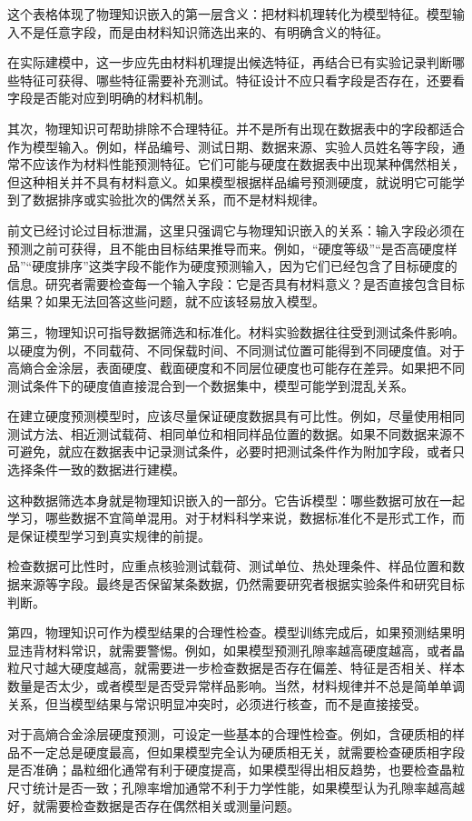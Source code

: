 这个表格体现了物理知识嵌入的第一层含义：把材料机理转化为模型特征。模型输入不是任意字段，而是由材料知识筛选出来的、有明确含义的特征。


在实际建模中，这一步应先由材料机理提出候选特征，再结合已有实验记录判断哪些特征可获得、哪些特征需要补充测试。特征设计不应只看字段是否存在，还要看字段是否能对应到明确的材料机制。


其次，物理知识可帮助排除不合理特征。并不是所有出现在数据表中的字段都适合作为模型输入。例如，样品编号、测试日期、数据来源、实验人员姓名等字段，通常不应该作为材料性能预测特征。它们可能与硬度在数据表中出现某种偶然相关，但这种相关并不具有材料意义。如果模型根据样品编号预测硬度，就说明它可能学到了数据排序或实验批次的偶然关系，而不是材料规律。


前文已经讨论过目标泄漏，这里只强调它与物理知识嵌入的关系：输入字段必须在预测之前可获得，且不能由目标结果推导而来。例如，“硬度等级”“是否高硬度样品”“硬度排序”这类字段不能作为硬度预测输入，因为它们已经包含了目标硬度的信息。研究者需要检查每一个输入字段：它是否具有材料意义？是否直接包含目标结果？如果无法回答这些问题，就不应该轻易放入模型。


第三，物理知识可指导数据筛选和标准化。材料实验数据往往受到测试条件影响。以硬度为例，不同载荷、不同保载时间、不同测试位置可能得到不同硬度值。对于高熵合金涂层，表面硬度、截面硬度和不同层位硬度也可能存在差异。如果把不同测试条件下的硬度值直接混合到一个数据集中，模型可能学到混乱关系。


在建立硬度预测模型时，应该尽量保证硬度数据具有可比性。例如，尽量使用相同测试方法、相近测试载荷、相同单位和相同样品位置的数据。如果不同数据来源不可避免，就应在数据表中记录测试条件，必要时把测试条件作为附加字段，或者只选择条件一致的数据进行建模。


这种数据筛选本身就是物理知识嵌入的一部分。它告诉模型：哪些数据可放在一起学习，哪些数据不宜简单混用。对于材料科学来说，数据标准化不是形式工作，而是保证模型学习到真实规律的前提。


检查数据可比性时，应重点核验测试载荷、测试单位、热处理条件、样品位置和数据来源等字段。最终是否保留某条数据，仍然需要研究者根据实验条件和研究目标判断。


第四，物理知识可作为模型结果的合理性检查。模型训练完成后，如果预测结果明显违背材料常识，就需要警惕。例如，如果模型预测孔隙率越高硬度越高，或者晶粒尺寸越大硬度越高，就需要进一步检查数据是否存在偏差、特征是否相关、样本数量是否太少，或者模型是否受异常样品影响。当然，材料规律并不总是简单单调关系，但当模型结果与常识明显冲突时，必须进行核查，而不是直接接受。


对于高熵合金涂层硬度预测，可设定一些基本的合理性检查。例如，含硬质相的样品不一定总是硬度最高，但如果模型完全认为硬质相无关，就需要检查硬质相字段是否准确；晶粒细化通常有利于硬度提高，如果模型得出相反趋势，也要检查晶粒尺寸统计是否一致；孔隙率增加通常不利于力学性能，如果模型认为孔隙率越高越好，就需要检查数据是否存在偶然相关或测量问题。


